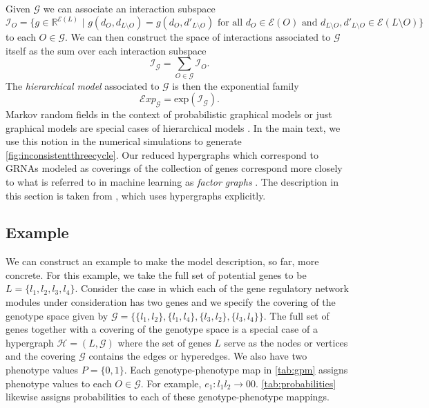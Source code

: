 Given $\mathcal{G}$ we can associate an interaction subspace
$$
\mathcal{I}_{O} = \{ g \in \mathbb{R}^{\mathcal{E}(L)}\,\, |\,\, g(d_O,d_{L \setminus O}) = g(d_O,d'_{L \setminus O}) \text{ for all } d_O \in \mathcal{E}(O) \text{ and } d_{L \setminus O},d'_{L \setminus O} \in \mathcal{E}(L \setminus O)\}
$$
to each $O \in \mathcal{G}$. We can then construct the space of interactions associated to $\mathcal{G}$ itself as the sum over each interaction subspace
$$
\mathcal{I}_{\mathcal{G}} = \sum_{O \in \mathcal{G}} \mathcal{I}_{O}.
$$
The \emph{hierarchical model} \cite{Lauritzen1996} associated to $\mathcal{G}$ is then the exponential family
$$
\mathcal{E}xp_{\mathcal{G}} = \text{exp}(\mathcal{I}_{\mathcal{G}}).
$$
Markov random fields in the context of probabilistic graphical models or just graphical models are special cases of hierarchical models \cite{Lauritzen1996,Murphy2012}. In the main text, we use this notion in the numerical simulations to generate \ref{fig:inconsistentthreecycle}. Our reduced hypergraphs which correspond to GRNAs modeled as coverings of the collection of genes correspond more closely to what is referred to in machine learning as \emph{factor graphs} \cite{Barber2012,Bishop2007,Murphy2012,Koller2009}. The description in this section is taken from \cite{Lauritzen1996}, which uses hypergraphs explicitly.

\subsection{Example}
We can construct an example to make the model description, so far, more concrete. For this example, we take the full set of potential genes to be $L = \{ l_1,l_2,l_3,l_4 \}$. Consider the case in which each of the gene regulatory network modules under consideration has two genes and we specify the covering of the genotype space given by $\mathcal{G} = \{\{l_1,l_2 \},\{l_1,l_4 \},\{l_3,l_2\},\{l_3,l_4\} \}$. The full set of genes together with a covering of the genotype space is a special case of a hypergraph $\mathcal{H} = (L,\mathcal{G})$ where the set of genes $L$ serve as the nodes or vertices and the covering $\mathcal{G}$ contains the edges or hyperedges. We also have two phenotype values $P = \{0, 1\}$. Each genotype-phenotype map in \ref{tab:gpm} assigns phenotype values to each $O \in \mathcal{G}$. For example, $e_1 \colon   l_1 l_2 \rightarrow 00$. \ref{tab:probabilities} likewise assigns probabilities to each of these genotype-phenotype mappings.

